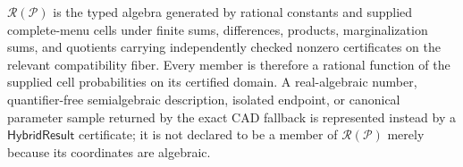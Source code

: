 \(\mathscr R(\mathcal P)\) is the typed algebra generated by rational constants and supplied complete-menu cells under finite sums, differences, products, marginalization sums, and quotients carrying independently checked nonzero certificates on the relevant compatibility fiber.  Every member is therefore a rational function of the supplied cell probabilities on its certified domain.  A real-algebraic number, quantifier-free semialgebraic description, isolated endpoint, or canonical parameter sample returned by the exact CAD fallback is represented instead by a \(\mathsf{HybridResult}\) certificate; it is not declared to be a member of \(\mathscr R(\mathcal P)\) merely because its coordinates are algebraic.
